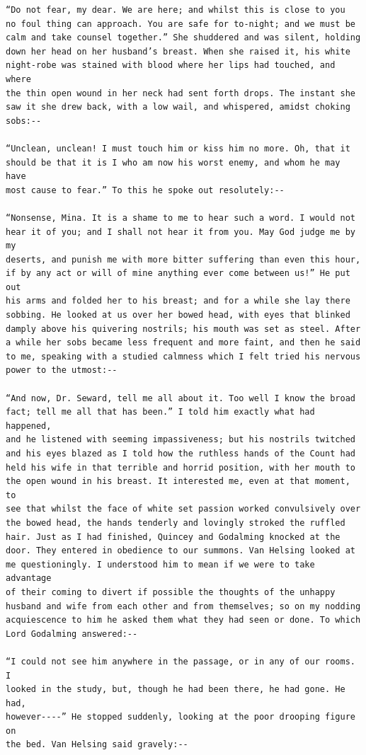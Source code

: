 \documentclass{article}
\begin{document}
\begin{verbatim}
“Do not fear, my dear. We are here; and whilst this is close to you
no foul thing can approach. You are safe for to-night; and we must be
calm and take counsel together.” She shuddered and was silent, holding
down her head on her husband’s breast. When she raised it, his white
night-robe was stained with blood where her lips had touched, and where
the thin open wound in her neck had sent forth drops. The instant she
saw it she drew back, with a low wail, and whispered, amidst choking
sobs:--

“Unclean, unclean! I must touch him or kiss him no more. Oh, that it
should be that it is I who am now his worst enemy, and whom he may have
most cause to fear.” To this he spoke out resolutely:--

“Nonsense, Mina. It is a shame to me to hear such a word. I would not
hear it of you; and I shall not hear it from you. May God judge me by my
deserts, and punish me with more bitter suffering than even this hour,
if by any act or will of mine anything ever come between us!” He put out
his arms and folded her to his breast; and for a while she lay there
sobbing. He looked at us over her bowed head, with eyes that blinked
damply above his quivering nostrils; his mouth was set as steel. After
a while her sobs became less frequent and more faint, and then he said
to me, speaking with a studied calmness which I felt tried his nervous
power to the utmost:--

“And now, Dr. Seward, tell me all about it. Too well I know the broad
fact; tell me all that has been.” I told him exactly what had happened,
and he listened with seeming impassiveness; but his nostrils twitched
and his eyes blazed as I told how the ruthless hands of the Count had
held his wife in that terrible and horrid position, with her mouth to
the open wound in his breast. It interested me, even at that moment, to
see that whilst the face of white set passion worked convulsively over
the bowed head, the hands tenderly and lovingly stroked the ruffled
hair. Just as I had finished, Quincey and Godalming knocked at the
door. They entered in obedience to our summons. Van Helsing looked at
me questioningly. I understood him to mean if we were to take advantage
of their coming to divert if possible the thoughts of the unhappy
husband and wife from each other and from themselves; so on my nodding
acquiescence to him he asked them what they had seen or done. To which
Lord Godalming answered:--

“I could not see him anywhere in the passage, or in any of our rooms. I
looked in the study, but, though he had been there, he had gone. He had,
however----” He stopped suddenly, looking at the poor drooping figure on
the bed. Van Helsing said gravely:--


\end{verbatim}
\end{document}
